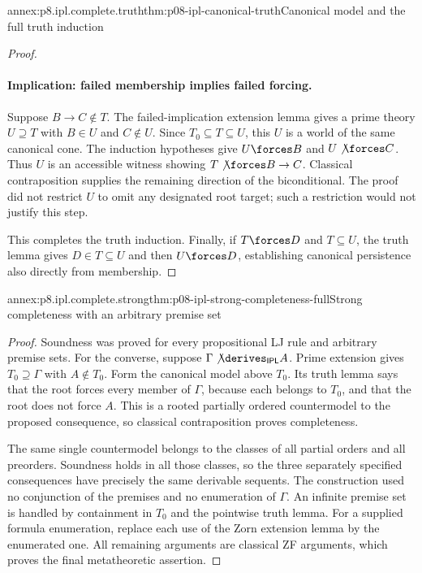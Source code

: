 \begin{annexitem}{annex:p8.ipl.complete.truth}{thm:p08-ipl-canonical-truth}{Canonical model and the full truth induction}
\begin{proof}
\paragraph{Implication: failed membership implies failed forcing.}
Suppose \(B\to C\notin T\). The failed-implication extension lemma
gives a prime theory \(U\supseteq T\) with \(B\in U\) and
\(C\notin U\). Since \(T_0\subseteq T\subseteq U\), this
\(U\) is a world of the same canonical cone. The induction hypotheses
give \(U\forces B\) and \(U\not\forces C\). Thus \(U\) is an
accessible witness showing \(T\not\forces B\to C\).
Classical contraposition supplies the remaining direction of the
biconditional. The proof did not restrict \(U\) to omit any designated
root target; such a restriction would not justify this step.

This completes the truth induction. Finally, if \(T\forces D\) and
\(T\subseteq U\), the truth lemma gives \(D\in T\subseteq U\)
and then \(U\forces D\), establishing canonical persistence also
directly from membership.
\end{proof}
\end{annexitem}

\begin{annexitem}{annex:p8.ipl.complete.strong}{thm:p08-ipl-strong-completeness-full}{Strong completeness with an arbitrary premise set}
\begin{proof}
Soundness was proved for every propositional LJ rule and arbitrary
premise sets. For the converse, suppose
\(\Gamma\not\derives_{\mathsf{IPL}}A\). Prime extension gives
\(T_0\supseteq\Gamma\) with \(A\notin T_0\). Form the canonical
model above \(T_0\). Its truth lemma says that the root forces every
member of \(\Gamma\), because each belongs to \(T_0\), and that
the root does not force \(A\). This is a rooted partially ordered
countermodel to the proposed consequence, so classical contraposition
proves completeness.

The same single countermodel belongs to the classes of all partial
orders and all preorders. Soundness holds in all those classes, so the
three separately specified consequences have precisely the same
derivable sequents. The construction used no conjunction of the
premises and no enumeration of \(\Gamma\). An infinite premise set
is handled by containment in \(T_0\) and the pointwise truth lemma.
For a supplied formula enumeration, replace each use of the Zorn
extension lemma by the enumerated one. All remaining arguments are
classical ZF arguments, which proves the final metatheoretic assertion.
\end{proof}
\end{annexitem}

